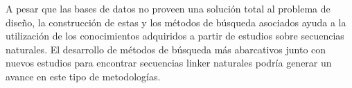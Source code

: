 A pesar que las bases de datos no proveen una solución total al problema de diseño, la construcción de estas y los métodos de búsqueda asociados 
ayuda a la utilización de los conocimientos adquiridos a partir de estudios sobre secuencias naturales.
El desarrollo de métodos de búsqueda más abarcativos junto con nuevos estudios para encontrar secuencias linker naturales podría generar un avance en este tipo de metodologías.









































